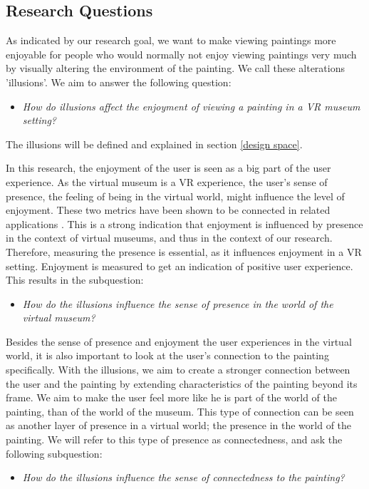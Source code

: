 \documentclass[a4paper]{article}
\begin{document}
\subsection {Research Questions}

As indicated by our research goal, we want to make viewing paintings more enjoyable for people who would normally not enjoy viewing paintings very much by visually altering the environment of the painting. We call these alterations 'illusions'. We aim to answer the following question:
\begin{itemize}
\item{\emph{How do illusions affect the enjoyment of viewing a painting in a VR museum setting?}}
\end{itemize}
The illusions will be defined and explained in section \ref{design space}. 

In this research, the enjoyment of the user is seen as a big part of the user experience. As the virtual museum is a VR experience, the user's sense of presence, the feeling of being in the virtual world, might influence the level of enjoyment. These two metrics have been shown to be connected in related applications \cite{sylaiou}. This is a strong indication that enjoyment is influenced by presence in the context of virtual museums, and thus in the context of our research. Therefore, measuring the presence is essential, as it influences enjoyment in a VR setting. Enjoyment is measured to get an indication of positive user experience. This results in the subquestion:

\begin{itemize}
\item{\emph{How do the illusions influence the sense of presence in the world of the virtual museum?}}
\end{itemize}

Besides the sense of presence and enjoyment the user experiences in the virtual world, it is also important to look at the user’s connection to the painting specifically. With the illusions, we aim to create a stronger connection between the user and the painting by extending characteristics of the painting beyond its frame. We aim to make the user feel more like he is part of the world of the painting, than of the world of the museum. This type of connection can be seen as another layer of presence in a virtual world; the presence in the world of the painting. We will refer to this type of presence as connectedness, and ask the following subquestion:

\begin{itemize}
\item{\emph{How do the illusions influence the sense of connectedness to the painting?}}
\end{itemize}
\end{document}
